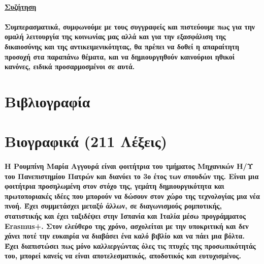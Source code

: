 \documentclass[12pt, A4]{article}
\newcommand{\tl}{\textlatin}
\begin{document}
    \paragraph{\underline{Συζήτηση}}
    \paragraph{Συμπερασματικά, συμφωνούμε με τους συγγραφείς και πιστεύουμε πως για την ομαλή λειτουργία της κοινωνίας μας αλλά και για την εξασφάλιση της δικαιοσύνης και της αντικειμενικότητας, θα πρέπει να δοθεί η απαραίτητη προσοχή στα παραπάνω θέματα, και να δημιουργηθούν καινούριοι ηθικοί κανόνες, ειδικά προσαρμοσμένοι σε αυτά.}
    \newpage
    
    \section{Βιβλιογραφία}
    
    
    
    \newpage
    
    \section{Βιογραφικά (211 Λέξεις)}
    
    \paragraph{Η Ρουμπίνη Μαρία Αγγουρά είναι φοιτήτρια του τμήματος Μηχανικών Η/Υ του Πανεπιστημίου Πατρών και διανύει το 3ο έτος των σπουδών της. Είναι μια φοιτήτρια προσηλωμένη στον στόχο της, γεμάτη δημιουργικότητα και πρωτοποριακές ιδέες που μπορούν να δώσουν στον χώρο της τεχνολογίας μια νέα πνοή. Έχει συμμετάσχει μεταξύ άλλων, σε διαγωνισμούς ρομποτικής, στατιστικής και έχει ταξιδέψει στην Ισπανία και Ιταλία μέσω προγράμματος \tl{Erasmus}+. Στον ελεύθερο της χρόνο, ασχολείται με την υποκριτική και δεν χάνει ποτέ την ευκαιρία να διαβάσει ένα καλό βιβλίο και να πάει μια βόλτα. Έχει διαπιστώσει πως μόνο καλλιεργώντας όλες τις πτυχές της προσωπικότητάς του, μπορεί κανείς να είναι αποτελεσματικός, αποδοτικός και ευτυχισμένος.\\}
    
\end{document}
